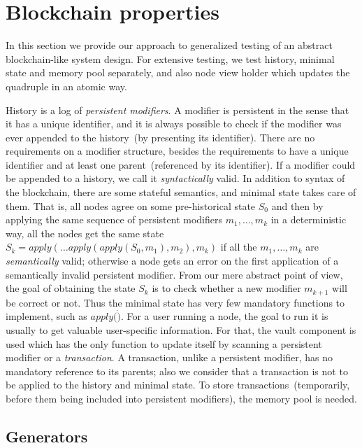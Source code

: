 
\section{Blockchain properties}
\label{sec:props}

In this section we provide our approach to generalized testing of an abstract blockchain-like system design. For extensive testing, we test history, minimal state and memory pool separately, and also node view holder which updates the quadruple {\em <history, minimal state, vault, memory pool>} in an atomic way.

History is a log of {\em persistent modifiers}. A modifier is persistent in the sense that it has a unique identifier, and it is always possible to check if the modifier was ever appended to the history~(by presenting its identifier). There are no requirements on a modifier structure, besides the requirements to have a unique identifier and at least one parent~(referenced by its identifier). If a modifier could be appended to a history, we call it {\em syntactically} valid. In addition to syntax of the blockchain, there are some stateful semantics, and minimal state takes care of them. That is, all nodes agree on some pre-historical state $S_0$ and then by applying the same sequence of persistent modifiers $m_1, \ldots, m_k$ in a deterministic way, all the nodes get the same state $S_k = apply(\ldots apply(apply(S_0, m_1), m_2), m_k)$ if all the $m_1, \ldots, m_k$ are {\em semantically} valid; otherwise a node gets an error on the first application of a semantically invalid persistent modifier. From our mere abstract point of view, the goal of obtaining the state $S_k$ is to check whether a new modifier $m_{k+1}$ will be correct or not. Thus the minimal state has very few mandatory functions to implement, such as $apply(\dot)$. For a user running a node, the goal to run it is usually to get valuable user-specific information. For that, the vault component is used which has the only function to update itself by scanning a persistent modifier or a {\em transaction}. A transaction, unlike a persistent modifier, has no mandatory reference to its parents; also we consider that a transaction is not to be applied to the history and minimal state. To store transactions~(temporarily, before them being included into persistent modifiers), the memory pool is needed.      


\subsection{Generators}

